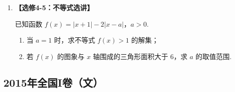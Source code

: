 \begin{description}
\begin{enumerate}[leftmargin=5pt]
        \item \textbf{【选修4-5：不等式选讲】}

已知函数 \( f(x) = |x + 1| - 2|x - a| \)，\( a > 0 \).

\begin{enumerate}
\item 当 \(a = 1\) 时，求不等式 \(f(x) > 1\) 的解集；
\item 若 \(f(x)\) 的图象与 \(x\) 轴围成的三角形面积大于 \(6\)，求 \(a\) 的取值范围.
\end{enumerate}

    \end{enumerate}

\end{description}


\subsection{2015年全国I卷（文）}\label{gk:2015年全国I卷（文）}

